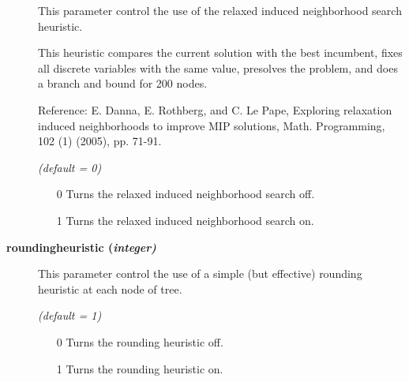 \begin{description}
This parameter control the use of the relaxed induced neighborhood search heuristic.

This heuristic compares the current solution with the best incumbent, fixes all discrete variables with the same value, presolves the problem, and does a branch and bound for 200 nodes.

Reference: E. Danna, E. Rothberg, and C. Le Pape, Exploring relaxation induced neighborhoods to improve MIP solutions, Math. Programming, 102 (1) (2005), pp. 71-91.

\textsl{(default = 0)}
\begin{itemize}
\item[0] 
Turns the relaxed induced neighborhood search off.
\item[1] 
Turns the relaxed induced neighborhood search on.
\end{itemize}

\item[\label{roundingheuristic}\hypertarget{roundingheuristic}
{\textbf{roundingheuristic (\slshape{integer})}}]\hspace{1.0in}

This parameter control the use of a simple (but effective) rounding heuristic at each node of tree.

\textsl{(default = 1)}
\begin{itemize}
\item[0] 
Turns the rounding heuristic off.
\item[1] 
Turns the rounding heuristic on.
\end{itemize}

\end{description}
